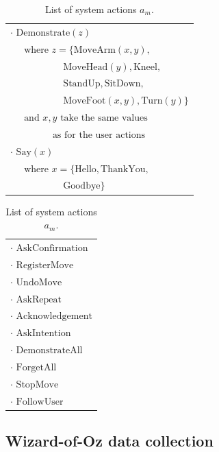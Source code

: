 \begin{table}[ht]
\begin{footnotesize}
\begin{tabular}{p{60mm}} 
$\cdot$ $\mathrm{Demonstrate}(z)$ \\ $\ \ \ \ \ \text { where } z = \{\mathrm{MoveArm}(x,y), $ \\ $\ \ \ \ \ \ \ \ \ \ \ \ \ \ \ \ \ \ \ \ \ \ \ \ \  \mathrm{MoveHead}(y),\mathrm{Kneel}, $ \\ $\ \ \ \ \ \ \ \ \ \ \ \ \ \ \ \ \ \ \ \ \ \ \ \ \  \mathrm{StandUp},\mathrm{SitDown}, $ \\ $\ \ \ \ \ \ \ \ \ \ \ \ \ \ \ \ \ \ \ \ \ \ \ \ \  \mathrm{MoveFoot}(x,y), \mathrm{Turn}(y)\}$ \\ $\ \ \ \ \ \text{ and } x, y \text{ take the same values}$ \\ $\ \ \ \ \ \ \ \ \ \ \ \ \ \ \ \ \ \ \ \ \text{as for the user actions}$ \\
$\cdot$ $\mathrm{Say}(x)$ \\  $ \ \ \ \ \  \text{ where } x = \{\mathrm{Hello, ThankYou,}$ \\ $\ \ \ \ \ \ \ \ \ \ \ \ \ \ \ \ \ \ \ \ \ \ \ \ \  \mathrm{Goodbye}\}$
\end{tabular}
\hspace{2cm}
\begin{tabular}{p{60mm}} 
$\cdot$ $\mathrm{AskConfirmation}$ \\
$\cdot$ $\mathrm{RegisterMove}$ \\
$\cdot$ $\mathrm{UndoMove}$ \\
$\cdot$ $\mathrm{AskRepeat}$ \\
$\cdot$ $\mathrm{Acknowledgement}$ \\
$\cdot$ $\mathrm{AskIntention}$ \\
$\cdot$ $\mathrm{DemonstrateAll}$ \\
$\cdot$ $\mathrm{ForgetAll}$ \\
$\cdot$ $\mathrm{StopMove}$ \\
$\cdot$ $\mathrm{FollowUser}$ 

\end{tabular}
\end{footnotesize}
\caption{List of system actions $a_m$.} 
\label{table:systemdas}
\end{table}

\subsection{Wizard-of-Oz data collection}
\label{sec:wozlearning-experiments-woz}

